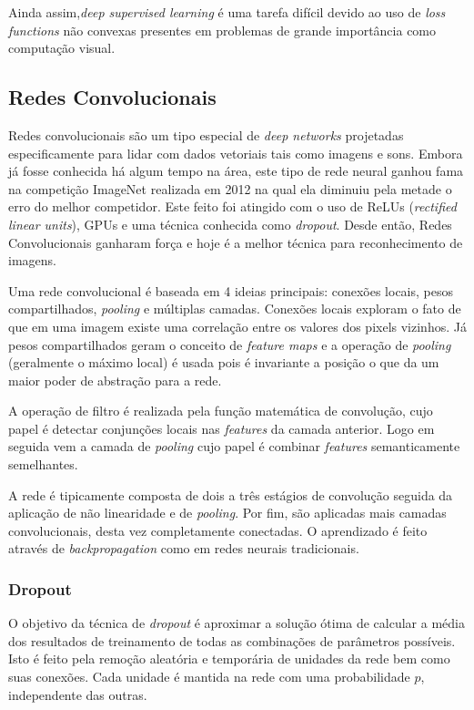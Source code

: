 Ainda assim,\emph{deep supervised learning} é uma tarefa difícil devido ao uso
de \emph{loss functions} não convexas presentes em problemas de grande
importância como computação visual.

\subsection{Redes Convolucionais}

Redes convolucionais são um tipo especial de \emph{deep networks} projetadas
especificamente para lidar com dados vetoriais tais como imagens e sons.
Embora já fosse conhecida há algum tempo na área, este tipo de rede neural
ganhou fama na competição ImageNet realizada em 2012 na qual ela diminuiu pela
metade o erro do melhor competidor. Este feito foi atingido com o uso de ReLUs
(\emph{rectified linear units}), GPUs e uma técnica conhecida como
\emph{dropout}. Desde então, Redes Convolucionais ganharam força e hoje é a
melhor técnica para reconhecimento de imagens.\cite{lecun2015deep}

Uma rede convolucional é baseada em 4 ideias principais: conexões locais, pesos
compartilhados, \emph{pooling} e múltiplas camadas. Conexões locais exploram o
fato de que em uma imagem existe uma correlação entre os valores dos pixels
vizinhos. Já pesos compartilhados geram o conceito de \emph{feature maps} e a
operação de \emph{pooling} (geralmente o máximo local) é usada pois é
invariante a posição o que da um maior poder de abstração para a
rede.\cite{lecun2015deep}

A operação de filtro é realizada pela função matemática de convolução, cujo
papel é detectar conjunções locais nas \emph{features} da camada anterior. Logo
em seguida vem a camada de \emph{pooling} cujo papel é combinar \emph{features}
semanticamente semelhantes.\cite{lecun2015deep}

A rede é tipicamente composta de dois a três estágios de convolução seguida da
aplicação de não linearidade e de \emph{pooling}. Por fim, são aplicadas mais
camadas convolucionais, desta vez completamente conectadas. O aprendizado é
feito através de \emph{backpropagation} como em redes neurais
tradicionais.\cite{lecun2015deep}

\subsubsection{Dropout}

O objetivo da técnica de \emph{dropout} é aproximar a solução ótima de calcular
a média dos resultados de treinamento de todas as combinações de parâmetros
possíveis. Isto é feito pela remoção aleatória e temporária de unidades da rede
bem como suas conexões. Cada unidade é mantida na rede com uma probabilidade
$p$, independente das outras.\cite{srivastava2014dropout}

